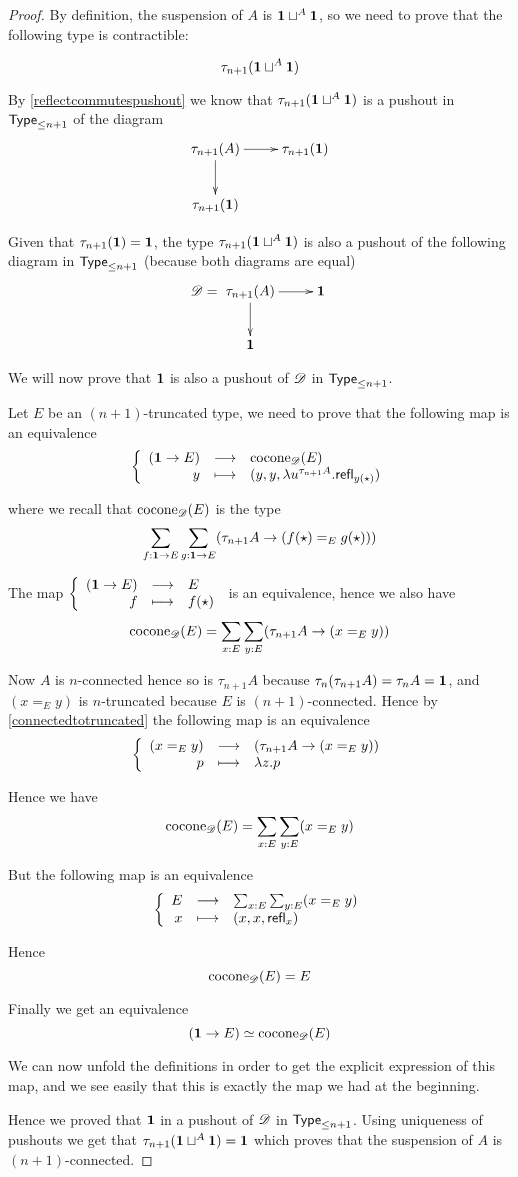 \begin{proof}
  By definition, the suspension of $A$ is $\mathbf{1}\sqcup^A\mathbf{1}$, so we need to
  prove that the following type is contractible:

  \[\tau_{n+1}(\mathbf{1}\sqcup^A\mathbf{1})\]

  By \autoref{reflectcommutespushout} we know that
  $\tau_{n+1}(\mathbf{1}\sqcup^A\mathbf{1})$ is a pushout in $\mathsf{Type}_{\le n+1}$ of the diagram
  \[\xymatrix{\tau_{n+1}(A) \ar[d] \ar[r] & \tau_{n+1}(\unit) \\
    \tau_{n+1}(\unit) & }\]

  Given that $\tau_{n+1}(\mathbf{1})=\mathbf{1}$, the type
  $\tau_{n+1}(\mathbf{1}\sqcup^A\mathbf{1})$ is also a pushout of the following diagram in
  $\mathsf{Type}_{\le n+1}$ (because both diagrams are equal)
  \[\Ddiag=\xymatrix{\tau_{n+1}(A) \ar[d] \ar[r] & \unit \\
    \unit & }\]

  We will now prove that $\mathbf{1}$ is also a pushout of $\mathscr{D}$ in
  $\mathsf{Type}_{\le n+1}$.

  \bigskip

  Let $E$ be an $(n+1)$-truncated type, we need to prove that the following map
  is an equivalence
  \[\left\{\begin{array}{rcl}(\mathbf{1}\to{}E) & \longrightarrow & \mathrm{cocone}_{\mathscr{D}}(E) \\ y & \longmapsto & (y,y,\lambda{}u^{\tau_{n+1}A}.\mathsf{refl}_{y(\star)}) \end{array}\right.\]

  where we recall that $\mathrm{cocone}_{\mathscr{D}}(E)$ is the type
  \[\sum_{f:\mathbf{1}\to{}E}\sum_{g:\mathbf{1}\to{}E}(\tau_{n+1}A\to
  (f(\star)=_E{}g(\star)))\]

  The map $\left\{\begin{array}{rcl}(\mathbf{1}\to{}E) & \longrightarrow & E \\ f & \longmapsto & f(\star) \end{array}\right.$ is an equivalence, hence
  we also have
  \[\mathrm{cocone}_{\mathscr{D}}(E)=\sum_{x:E}\sum_{y:E}(\tau_{n+1}A\to(x=_Ey))\]

  Now $A$ is $n$-connected hence so is $\tau_{n+1}A$ because
  $\tau_n(\tau_{n+1}A)=\tau_nA=\mathbf{1}$, and $(x=_Ey)$ is $n$-truncated because
  $E$ is $(n+1)$-connected. Hence by \autoref{connectedtotruncated} the
  following map is an equivalence
  \[\left\{\begin{array}{rcl}(x=_Ey) & \longrightarrow & (\tau_{n+1}A\to(x=_Ey)) \\ p & \longmapsto & \lambda{}z.p \end{array}\right.\]

  Hence we have
  \[\mathrm{cocone}_{\mathscr{D}}(E)=\sum_{x:E}\sum_{y:E}(x=_Ey)\]

  But the following map is an equivalence
  \[\left\{\begin{array}{rcl}E & \longrightarrow & \sum_{x:E}\sum_{y:E}(x=_Ey) \\ x & \longmapsto & (x,x,\mathsf{refl}_{x}) \end{array}\right.\]

  Hence
  \[\mathrm{cocone}_{\mathscr{D}}(E)=E\]

  Finally we get an equivalence
  \[(\mathbf{1}\to{}E)\simeq\mathrm{cocone}_{\mathscr{D}}(E)\]

  We can now unfold the definitions in order to get the explicit expression of
  this map, and we see easily that this is exactly the map we had at the
  beginning.

  \bigskip

  Hence we proved that $\mathbf{1}$ in a pushout of $\mathscr{D}$ in $\mathsf{Type}_{\le n+1}$. Using
  uniqueness of pushouts we get that $\tau_{n+1}(\mathbf{1}\sqcup^A\mathbf{1})=\mathbf{1}$
  which proves that the suspension of $A$ is $(n+1)$-connected.
\end{proof}

